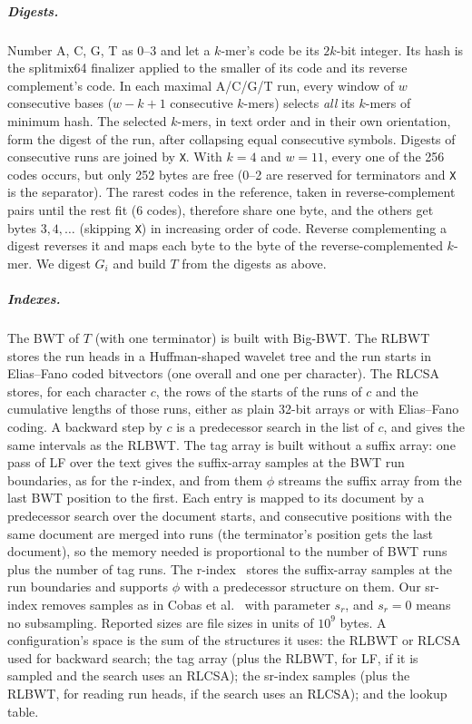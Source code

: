 \subparagraph*{Digests.}
Number A, C, G, T as 0--3 and let a $k$-mer's code be its $2k$-bit integer.
Its hash is the splitmix64 finalizer applied to the smaller of its code and its reverse complement's code.
In each maximal A/C/G/T run, every window of $w$ consecutive bases ($w - k + 1$ consecutive $k$-mers) selects \emph{all} its $k$-mers of minimum hash.
The selected $k$-mers, in text order and in their own orientation, form the digest of the run, after collapsing equal consecutive symbols.
Digests of consecutive runs are joined by \texttt{X}.
With $k = 4$ and $w = 11$, every one of the 256 codes occurs, but only 252 bytes are free (0--2 are reserved for terminators and \texttt{X} is the separator).
The rarest codes in the reference, taken in reverse-complement pairs until the rest fit (6 codes), therefore share one byte, and the others get bytes $3, 4, \ldots$ (skipping \texttt{X}) in increasing order of code.
Reverse complementing a digest reverses it and maps each byte to the byte of the reverse-complemented $k$-mer.
We digest $G_i$ and build $T$ from the digests as above.

\subparagraph*{Indexes.}
The BWT of $T$ (with one terminator) is built with Big-BWT.
The RLBWT stores the run heads in a Huffman-shaped wavelet tree and the run starts in Elias--Fano coded bitvectors (one overall and one per character).
The RLCSA stores, for each character $c$, the rows of the starts of the runs of $c$ and the cumulative lengths of those runs, either as plain 32-bit arrays or with Elias--Fano coding.
A backward step by $c$ is a predecessor search in the list of $c$, and gives the same intervals as the RLBWT.
The tag array is built without a suffix array: one pass of LF over the text gives the suffix-array samples at the BWT run boundaries, as for the r-index, and from them $\phi$ streams the suffix array from the last BWT position to the first.
Each entry is mapped to its document by a predecessor search over the document starts, and consecutive positions with the same document are merged into runs (the terminator's position gets the last document), so the memory needed is proportional to the number of BWT runs plus the number of tag runs.
The r-index~\cite{GagieNavarroPrezza2020} stores the suffix-array samples at the run boundaries and supports $\phi$ with a predecessor structure on them.
Our sr-index removes samples as in Cobas et al.~\cite{CGN21,CGN25} with parameter $s_r$, and $s_r = 0$ means no subsampling.
Reported sizes are file sizes in units of $10^9$ bytes.
A configuration's space is the sum of the structures it uses: the RLBWT or RLCSA used for backward search; the tag array (plus the RLBWT, for LF, if it is sampled and the search uses an RLCSA); the sr-index samples (plus the RLBWT, for reading run heads, if the search uses an RLCSA); and the lookup table.

